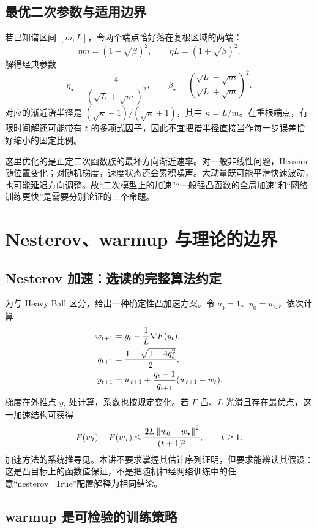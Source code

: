 \subsection{最优二次参数与适用边界}

若已知谱区间 $[m,L]$，令两个端点恰好落在复根区域的两端：
\[
 \eta m=(1-\sqrt\beta)^2,
 \qquad \eta L=(1+\sqrt\beta)^2.
\]
解得经典参数\citep{Polyak1964}
\begin{equation}
 \eta_\star=\frac{4}{(\sqrt L+\sqrt m)^2},\qquad
 \beta_\star=\left(\frac{\sqrt L-\sqrt m}{\sqrt L+\sqrt m}\right)^2.
 \label{l3:hb-optimal}
\end{equation}
对应的渐近谱半径是
$(\sqrt\kappa-1)/(\sqrt\kappa+1)$，其中 $\kappa=L/m$。在重根端点，有限时间解还可能带有 $t$ 的多项式因子，因此不宜把谱半径直接当作每一步误差恰好缩小的固定比例。

这里优化的是正定二次函数族的最坏方向渐近速率。对一般非线性问题，Hessian 随位置变化；对随机梯度，速度状态还会累积噪声。大动量既可能平滑快速波动，也可能延迟方向调整。故“二次模型上的加速”“一般强凸函数的全局加速”和“网络训练更快”是需要分别论证的三个命题。

\section{Nesterov、warmup 与理论的边界}
\label{l3:nesterov-warmup}

\subsection{Nesterov 加速：选读的完整算法约定}

为与 Heavy Ball 区分，给出一种确定性凸加速方案。令 $q_0=1$、$y_0=w_0$，依次计算
\begin{align}
 w_{t+1}&=y_t-\frac1L\nabla F(y_t),\notag\\
 q_{t+1}&=\frac{1+\sqrt{1+4q_t^2}}2,\notag\\
 y_{t+1}&=w_{t+1}+\frac{q_t-1}{q_{t+1}}(w_{t+1}-w_t).
 \label{l3:nesterov}
\end{align}
梯度在外推点 $y_t$ 处计算，系数也按规定变化。若 $F$ 凸、$L$-光滑且存在最优点，这一加速结构可获得
\[
 F(w_t)-F(w_\star)\leq
 \frac{2L\left\lVert w_0-w_\star\right\rVert^2}{(t+1)^2},\qquad t\geq1.
\]
加速方法的系统推导见\citet{Nesterov2004}。本讲不要求掌握其估计序列证明，但要求能辨认其假设：这是凸目标上的函数值保证，不是把随机神经网络训练中的任意“nesterov=True”配置解释为相同结论。

\subsection{warmup 是可检验的训练策略}

